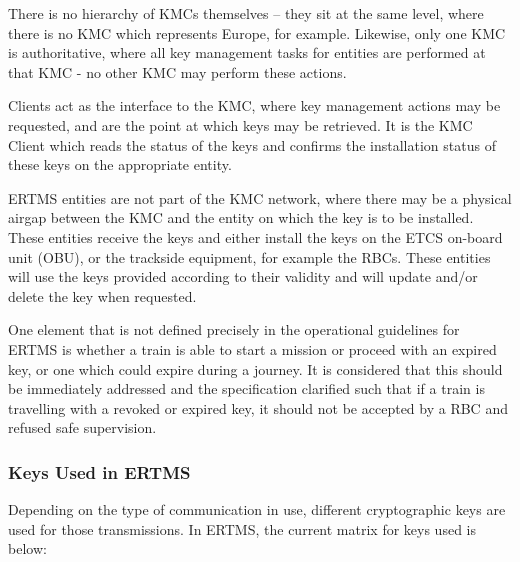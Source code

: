 \documentclass[twoside,11pt,a4paper]{article}
\begin{document}
There is no hierarchy of KMCs themselves -- they sit at the same level, where there is no KMC which represents Europe, for example. Likewise, only one KMC is authoritative, where all key management tasks for entities are performed at that KMC - no other KMC may perform these actions.

Clients act as the interface to the KMC, where key management actions may be requested, and are the point at which keys may be retrieved. It is the KMC Client which reads the status of the keys and confirms the installation status of these keys on the appropriate entity.

ERTMS entities are not part of the KMC network, where there may be a physical airgap between the KMC and the entity on which the key is to be installed. These entities receive the keys and either install the keys on the ETCS on-board unit (OBU), or the trackside equipment, for example the RBCs. These entities will use the keys provided according to their validity and will update and/or delete the key when requested.

One element that is not defined precisely in the operational guidelines for ERTMS is whether a train is able to start a mission or proceed with an expired key, or one which could expire during a journey. It is considered that this should be immediately addressed and the specification clarified such that if a train is travelling with a revoked or expired key, it should not be accepted by a RBC and refused safe supervision.

\subsubsection{Keys Used in ERTMS}
Depending on the type of communication in use, different cryptographic keys are used for those transmissions. In ERTMS, the current matrix \citep[p. 15]{SUBSET-038} for keys used is below:
\end{document}
